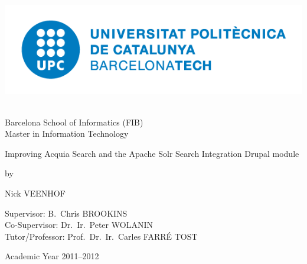 

\begin{titlepage}

\setlength{\hoffset}{-1in}
\setlength{\voffset}{-1in}
\setlength{\topmargin}{1.5cm}
\setlength{\headheight}{0.5cm}
\setlength{\headsep}{1cm}
\setlength{\oddsidemargin}{3cm}
\setlength{\evensidemargin}{3cm}
\setlength{\footskip}{1.5cm}
\enlargethispage{1cm}

\fontsize{12pt}{14pt}
\selectfont

\begin{center}

\includegraphics[height=5cm]{images/logoUPCblau-complet}

\vspace{0.5cm}

Barcelona School of Informatics (FIB)\\
Master in Information Technology\\

\vspace{3.5cm}

\fontsize{17.28pt}{21pt}
\selectfont

Improving Acquia Search and the Apache Solr Search Integration Drupal module\\

\fontsize{12pt}{14pt}
\selectfont

\vspace{.6cm}

by 

\vspace{.4cm}

Nick VEENHOF

\vspace{3.5cm}

Supervisor: B.~Chris BROOKINS\\
Co-Supervisor: Dr.~Ir.~Peter WOLANIN\\
Tutor/Professor: Prof.~Dr.~Ir.~Carles FARR\'{E} TOST\\

\vspace{2cm}

Academic Year 2011--2012

\end{center}
\end{titlepage}
